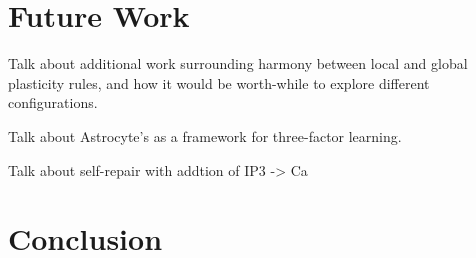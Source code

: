 %

\chapter{Future Work} \label{chapter:future-work}
Talk about additional work surrounding harmony between local and global
plasticity rules, and how it would be worth-while to explore different
configurations.

Talk about Astrocyte's as a framework for three-factor learning.

Talk about self-repair with addtion of IP3 -> Ca

\chapter{Conclusion} \label{chapter:conclusion}

